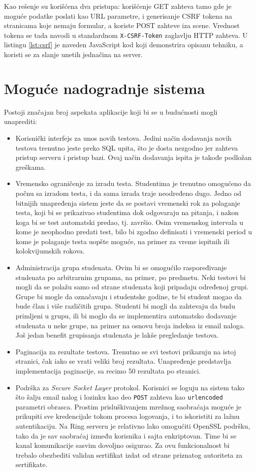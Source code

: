 {Kao rešenje su korišćena dva pristupa: korišćenje GET zahteva tamo gde je moguće podatke poslati kao URL parametre, i generisanje CSRF tokena na stranicama koje nemaju formular, a koriste POST zahteve iza scene. Vrednost tokena se tada navodi u standardnom \texttt{X-CSRF-Token} zaglavlju HTTP zahteva. U listingu \ref{lst:csrf} je naveden JavaScript kod koji demonstrira opisanu tehniku, a koristi se za slanje unetih jednačina na server.

\section{Moguće nadogradnje sistema}
Postoji značajan broj aspekata aplikacije koji bi se u budućnosti mogli unaprediti:
\begin{itemize}
\item Korisnički interfejs za unos novih testova. Jedini način dodavanja novih testova trenutno jeste preko SQL upita, što je dosta nezgodno jer zahteva pristup serveru i pristup bazi. Ovaj način dodavanja ispita je takođe podložan greškama.
\item Vremensko ograničenje za izradu testa. Studentima je trenutno omogućeno da počnu sa izradom testa, i da sama izrada traje neodređeno dugo. Jedno od bitnijih unapređenja sistem jeste da se postavi vremenski rok za polaganje testa, koji bi se prikazivao studentima dok odgovaraju na pitanja, i nakon koga bi se test automatski predao, tj. završio. Osim vremenskog intervala u kome je neophodno predati test, bilo bi zgodno definisati i vremenski period u kome je polaganje testa uopšte moguće, na primer za vreme ispitnih ili kolokvijumskih rokova.
\item Administracija grupa studenata. Ovim bi se omogućilo raspoređivanje studenata po arbitrarnim grupama, na primer, po predmetu. Neki testovi bi mogli da se polažu samo od strane studenata koji pripadaju određenoj grupi. Grupe bi mogle da označavaju i studentske godine, te bi student mogao da bude član i više različitih grupa. Studenti bi mogli da zahtevaju da budu primljeni u grupu, ili bi moglo da se implementira automatsko dodavanje studenata u neke grupe, na primer na osnovu broja indeksa iz email naloga. Još jedan benefit grupisanja studenata je lakše pregledanje testova.
\item Paginacija za rezultate testova. Trenutno se svi testovi prikazuju na istoj stranici, čak iako se vrati veliki broj rezultata. Unapređenje predstavlja implementacija paginacije, sa recimo 50 rezultata po stranici.
\item Podrška za \textit{Secure Socket Layer} protokol. Korisnici se loguju na sistem tako što šalju email nalog i lozinku kao deo \texttt{POST} zahteva kao \texttt{urlencoded} parametri obrasca. Prostim prisluškivanjem mrežnog saobraćaja moguće je prikupiti sve kredencijale tokom procesa logovanja, i to iskoristiti za lažnu autentikaciju. Na Ring serveru je relativno lako omogućiti OpenSSL podršku, tako da je sav saobraćaj između korisnika i sajta enkriptovan. Time bi se kanal komunikacije sasvim dovoljno osigurao. Za ovu funkcionalnost bi trebalo obezbediti validan sertifikat izdat od strane priznatog autoriteta za sertifikate.

\end{itemize}}
